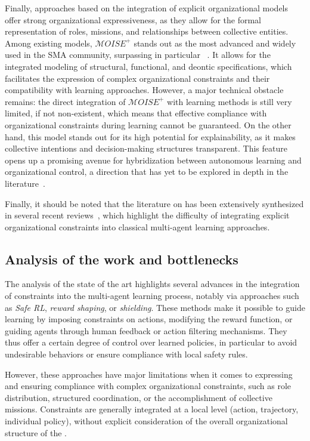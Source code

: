 Finally, approaches based on the integration of explicit organizational models offer strong organizational expressiveness, as they allow for the formal representation of roles, missions, and relationships between collective entities. Among existing models, $\mathcal{M}OISE^+$ stands out as the most advanced and widely used in the SMA community, surpassing in particular ~\cite{Ferber2004}. It allows for the integrated modeling of structural, functional, and deontic specifications, which facilitates the expression of complex organizational constraints and their compatibility with learning approaches.
%
However, a major technical obstacle remains: the direct integration of $\mathcal{M}OISE^+$ with learning methods is still very limited, if not non-existent, which means that effective compliance with organizational constraints during learning cannot be guaranteed. On the other hand, this model stands out for its high potential for explainability, as it makes collective intentions and decision-making structures transparent. This feature opens up a promising avenue for hybridization between autonomous learning and organizational control, a direction that has yet to be explored in depth in the literature~\cite{bordini2006jade, chernova2014robot}.

\medskip

\noindent
Finally, it should be noted that the literature on  has been extensively synthesized in several recent reviews~\cite{Zhang2021, Papoudakis2021}, which highlight the difficulty of integrating explicit organizational constraints into classical multi-agent learning approaches.

\subsection*{Analysis of the work and bottlenecks}

The analysis of the state of the art highlights several advances in the integration of constraints into the multi-agent learning process, notably via approaches such as \textit{Safe RL}, \textit{reward shaping}, or \textit {shielding}. These methods make it possible to guide learning by imposing constraints on actions, modifying the reward function, or guiding agents through human feedback or action filtering mechanisms. They thus offer a certain degree of control over learned policies, in particular to avoid undesirable behaviors or ensure compliance with local safety rules.

However, these approaches have major limitations when it comes to expressing and ensuring compliance with complex organizational constraints, such as role distribution, structured coordination, or the accomplishment of collective missions. Constraints are generally integrated at a local level (action, trajectory, individual policy), without explicit consideration of the overall organizational structure of the .

